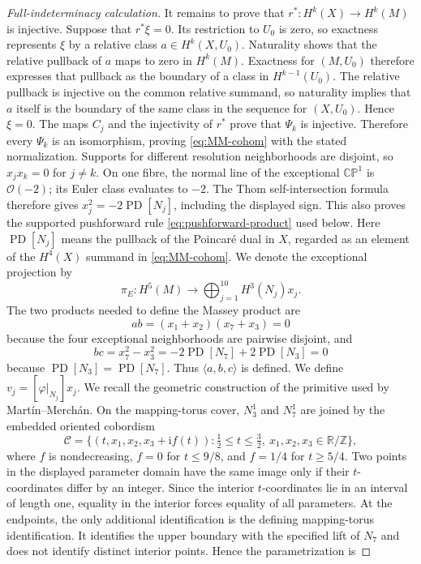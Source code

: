 \documentclass[11pt]{article}
\theoremstyle{remark}\newtheorem{remark}[theorem]{Remark}
\newcommand{\ii}{\mathrm i}
\newcommand{\R}{\mathbb R}
\newcommand{\Z}{\mathbb Z}
\newcommand{\CP}{\mathbb {CP}}
\newcommand{\PD}{\operatorname{PD}}
\begin{document}
\begin{proof}[Full-indeterminacy calculation]
It remains to prove that $r^*:H^k(X)\to H^k(M)$ is injective.  Suppose
that $r^*\xi=0$.  Its restriction to $U_0$ is zero, so exactness represents
$\xi$ by a relative class $a\in H^k(X,U_0)$.  Naturality shows that the
relative pullback of $a$ maps to zero in $H^k(M)$.  Exactness for
$(M,U_0)$ therefore expresses that pullback as the boundary of a class in
$H^{k-1}(U_0)$.  The relative pullback is injective on the common relative
summand, so naturality implies that $a$ itself is the boundary of the same
class in the sequence for $(X,U_0)$.  Hence $\xi=0$.  The maps $C_j$ and
the injectivity of $r^*$ prove that $\Psi_k$ is injective.  Therefore every
$\Psi_k$ is an isomorphism, proving \eqref{eq:MM-cohom} with the stated
normalization.  Supports for
different resolution neighborhoods are
disjoint, so $x_jx_k=0$ for $j\ne k$.  On one fibre, the normal line of the
exceptional $\CP^1$ is $\mathcal O(-2)$; its Euler class evaluates to
$-2$.  The Thom self-intersection formula therefore gives
$x_j^2=-2\PD[N_j]$, including the displayed sign.  This also proves the
supported pushforward rule \eqref{eq:pushforward-product} used below.
Here $\PD[N_j]$ means the pullback of the Poincar\'e dual in $X$, regarded
as an element of the $H^4(X)$ summand in \eqref{eq:MM-cohom}.  We denote
the exceptional projection by
\begin{equation}\label{eq:piE}
\pi_E:H^5(M)\longrightarrow
\bigoplus_{j=1}^{10}H^3(N_j)x_j.
\end{equation}
The two products needed to define the Massey product are
\[
ab=(x_1+x_2)(x_7+x_3)=0
\]
because the four exceptional neighborhoods are pairwise disjoint, and
\[
bc=x_7^2-x_3^2=-2\PD[N_7]+2\PD[N_3]=0
\]
because $\PD[N_3]=\PD[N_7]$.  Thus
$\langle a,b,c\rangle$ is defined.  We define
$v_j=[\varphi|_{N_j}]x_j$.  We recall the geometric
construction of the primitive used by Mart\'in--Merch\'an.  On the
mapping-torus cover, $N_3^1$ and $N_7^1$ are joined by the embedded
oriented cobordism
\[
 \mathcal C=\{(t,x_1,x_2,x_3+\ii f(t)):
  \tfrac12\leq t\leq\tfrac32,\ x_1,x_2,x_3\in\R/\Z\},
\]
where $f$ is nondecreasing, $f=0$ for $t\leq9/8$, and $f=1/4$ for
$t\geq5/4$.  Two points in the displayed parameter domain have the same
image only if their $t$-coordinates differ by an integer.  Since the
interior $t$-coordinates lie in an interval of length one, equality in the
interior forces equality of all parameters.  At the endpoints, the only
additional identification is the defining mapping-torus identification.
It identifies the upper boundary with the specified lift of $N_7$ and
does not identify distinct interior points.  Hence the parametrization is

\end{proof}
\end{document}

